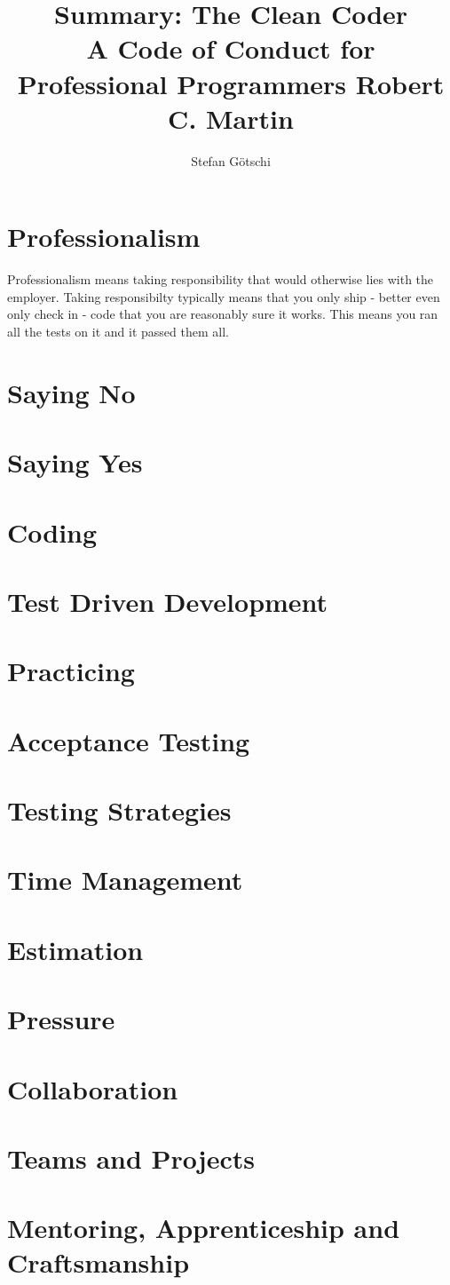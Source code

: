 \documentclass[a4paper, twocolumn]{article}
\title{Summary: The Clean Coder \\
	\large
	A Code of Conduct for Professional Programmers
	Robert C. Martin}
\author{Stefan Götschi}
\begin{document}
\maketitle

\section{Professionalism}
Professionalism means taking responsibility that would otherwise lies with the employer.
Taking responsibilty typically means that you only ship - better even only check in - code that you are reasonably sure it works. This means you ran all the tests on it and it passed them all.

\section{Saying No}

\section{Saying Yes}

\section{Coding}

\section{Test Driven Development}

\section{Practicing}

\section{Acceptance Testing}

\section{Testing Strategies}

\section{Time Management}

\section{Estimation}

\section{Pressure}

\section{Collaboration}

\section{Teams and Projects}

\section{Mentoring, Apprenticeship and Craftsmanship}
\end{document}
